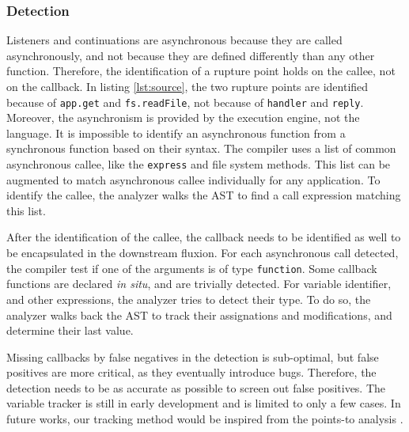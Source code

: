 \subsubsection{Detection}

Listeners and continuations are asynchronous because they are called asynchronously, and not because they are defined differently than any other function.
Therefore, the identification of a rupture point holds on the callee, not on the callback.
In listing \ref{lst:source}, the two rupture points are identified because of \texttt{app.get} and \texttt{fs.readFile}, not because of \texttt{handler} and \texttt{reply}.
Moreover, the asynchronism is provided by the execution engine, not the language.
It is impossible to identify an asynchronous function from a synchronous function based on their syntax.
The compiler uses a list of common asynchronous callee, like the \texttt{express} and file system methods.
This list can be augmented to match asynchronous callee individually for any application.
To identify the callee, the analyzer walks the AST to find a call expression matching this list.


After the identification of the callee, the callback needs to be identified as well to be encapsulated in the downstream fluxion.
For each asynchronous call detected, the compiler test if one of the arguments is of type \texttt{function}.
Some callback functions are declared \textit{in situ}, and are trivially detected.
For variable identifier, and other expressions, the analyzer tries to detect their type.
To do so, the analyzer walks back the AST to track their assignations and modifications, and determine their last value.

Missing callbacks by false negatives in the detection is sub-optimal, but false positives are more critical, as they eventually introduce bugs.
Therefore, the detection needs to be as accurate as possible to screen out false positives.
The variable tracker is still in early development and is limited to only a few cases.
In future works, our tracking method would be inspired from the points-to analysis \cite{Wei2014}.

